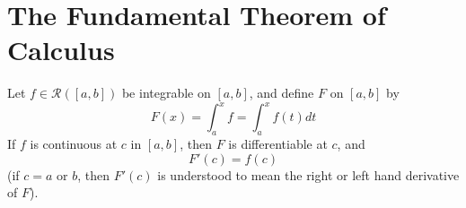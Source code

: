 \section{The Fundamental Theorem of Calculus}

\begin{theorem}\label{thm:FTC1}
    Let $f \in \mathcal{R}([a,b])$ be integrable on $[a,b]$, and define $F$ on $[a,b]$ by \begin{equation}
        F(x) = \int_a^xf = \int_a^xf(t)dt
    \end{equation}
    If $f$ is continuous at $c$ in $[a,b]$, then $F$ is differentiable at $c$, and \begin{equation}
        F'(c) = f(c)
    \end{equation}
    (if $c = a$ or $b$, then $F'(c)$ is understood to mean the right or left hand derivative of $F$).
\end{theorem}
